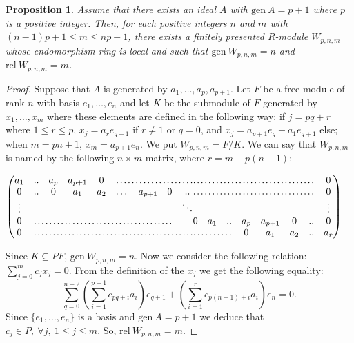 \documentclass{amsart}
\newtheorem{proposition}[theorem]{Proposition}
\begin{document}
\begin{proposition}
\label{P:locEnd} Assume that there exists an ideal $A$ with $\mathrm{gen}\ A=p+1$ where $p$ is a positive integer. Then, for each positive integers $n$ and $m$ with $(n-1)p+1\leq m\leq np+1$, there exists a finitely presented $R$-module $W_{p,n,m}$ whose endomorphism ring is local and such that $\mathrm{gen}\ W_{p,n,m}=n$ and $\mathrm{rel}\ W_{p,n,m}=m$. 
\end{proposition}
\begin{proof}
Suppose that $A$ is generated by $a_1,\dots,a_p,a_{p+1}$. Let $F$ be a free module of rank $n$ with basis $e_1,\dots,e_n$ and let $K$ be the submodule of $F$ generated by $x_1,\dots,x_m$ where these elements are defined in the following way: if $j= pq+r$ where $1\leq r\leq  p$, $x_j=a_re_{q+1}$ if $r\ne 1$ or $q=0$, and $x_j=a_{p+1}e_q+a_1e_{q+1}$ else; when $m=pn+1$, $x_m=a_{p+1}e_n$. We put $W_{p,n,m}=F/K$. 
 We can say that $W_{p,n,m}$ is named by the following $n\times m$ matrix, where $r=m-p(n-1)$:


\bigskip

\(\left( \begin{matrix}
a_1 &  .. & a_p & a_{p+1} & 0 & \hdotsfor[0.7]{4}\\
0 & .. & 0 & a_1 & a_2 & \dots &  a_{p+1} & 0  & .. \\
\vdots & & & & & & &  & \ddots\\
0 & \hdotsfor[0.7]{7} & \\
0 & \hdotsfor[0.7]{8} 
\end{matrix}
\begin{matrix}
 \hdotsfor[0.7]{7} & 0 \\
 \hdotsfor[0.7]{7}& 0 \\
& & & & & &  &  \vdots \\
 0 & a_1  & .. & a_p & a_{p+1} & 0 & .. & 0 \\
\hdotsfor[0.7]{3} & 0 & a_1 & a_2 & .. & a_r
\end{matrix}\right) 
\)

\bigskip

Since $K\subseteq PF$, $\mathrm{gen}\ W_{p,n,m}=n$. Now we consider the following relation: $\sum_{j=0}^{m}c_jx_j=0$. From the definition of the $x_j$ we get the following equality:
\[\sum_{q=0}^{n-2}\left( \sum_{i=1}^{p+1}c_{pq+i}a_i\right) e_{q+1}+\left( \sum_{i=1}^{r}c_{p(n-1)+i}a_i\right) e_n=0.\]
Since $\{e_1,\dots,e_n\}$ is a basis and $\mathrm{gen}\ A=p+1$ we deduce that $c_j\in P,\ \forall j,\ 1\leq j\leq m$. So, $\mathrm{rel}\ W_{p,n,m}=m$.


\end{proof}
\end{document}
